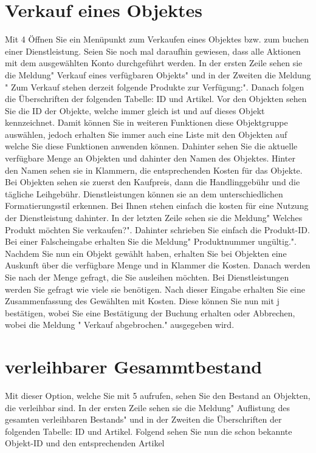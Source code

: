 ﻿\documentclass[a4paper,12pt,titlepage]{article}
\begin{document}
\section{Verkauf eines Objektes}
Mit 4 Öffnen Sie ein Menüpunkt zum Verkaufen eines Objektes bzw.  zum buchen einer Dienstleistung. Seien Sie noch mal daraufhin gewiesen, dass alle Aktionen mit dem ausgewählten Konto durchgeführt werden.
In der ersten Zeile sehen sie die Meldung" Verkauf eines verfügbaren Objekts" und in der Zweiten die Meldung " Zum Verkauf stehen derzeit folgende Produkte zur Verfügung:". Danach folgen die Überschriften der folgenden Tabelle: ID und Artikel.
Vor den Objekten sehen Sie die ID der Objekte, welche immer gleich ist und auf dieses Objekt kennzeichnet. Damit können Sie in weiteren Funktionen diese Objektgruppe auswählen, jedoch erhalten Sie immer auch eine Liste mit den Objekten auf welche Sie diese Funktionen anwenden können.
Dahinter sehen Sie die aktuelle verfügbare Menge an Objekten und dahinter den Namen des Objektes.
Hinter den Namen sehen sie in Klammern, die entsprechenden Kosten für das Objekte. Bei Objekten sehen sie zuerst den Kaufpreis, dann die Handlinggebühr und die tägliche Leihgebühr.
Dienstleistungen können sie an dem unterschiedlichen Formatierungsstil erkennen. Bei Ihnen stehen einfach die kosten für eine Nutzung der Dienstleistung dahinter.
In der letzten Zeile sehen sie die Meldung" Welches Produkt möchten Sie verkaufen?". Dahinter schrieben Sie einfach die Produkt-ID. Bei einer Falscheingabe erhalten Sie die Meldung" Produktnummer ungültig.".
Nachdem Sie nun ein Objekt gewählt haben, erhalten Sie bei Objekten eine Auskunft über die verfügbare Menge und in Klammer die Kosten. Danach werden Sie nach der Menge gefragt, die Sie ausleihen möchten. 
Bei Dienstleistungen werden Sie gefragt wie viele sie benötigen.
Nach dieser Eingabe erhalten Sie eine Zusammenfassung des Gewählten mit Kosten. 
Diese können Sie nun mit j bestätigen, wobei Sie eine Bestätigung der Buchung erhalten oder Abbrechen, wobei die Meldung " Verkauf abgebrochen." ausgegeben wird. 
\section{verleihbarer Gesammtbestand}
Mit dieser Option, welche Sie mit 5 aufrufen, sehen Sie den Bestand an Objekten, die verleihbar sind.
 In der ersten Zeile sehen sie die Meldung" Auflistung des gesamten verleihbaren Bestands" und in der Zweiten die Überschriften der folgenden Tabelle: ID und Artikel.
Folgend sehen Sie nun die schon bekannte Objekt-ID und den entsprechenden Artikel
\end{document}
